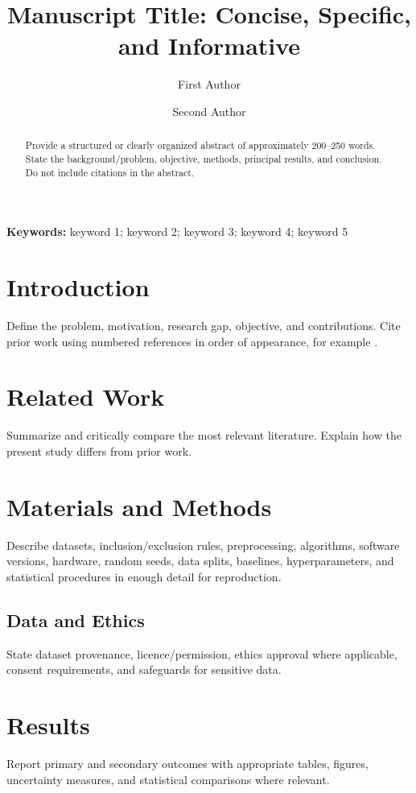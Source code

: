 \documentclass[11pt,a4paper]{article}
\title{Manuscript Title: Concise, Specific, and Informative}
\author[1]{First Author}
\author[2]{Second Author}
\affil[1]{Department, Faculty, University, City, Country}
\affil[2]{Department, Faculty, University, City, Country}
\date{}
\begin{document}
\maketitle

\begin{abstract}
Provide a structured or clearly organized abstract of approximately 200--250 words. State the background/problem, objective, methods, principal results, and conclusion. Do not include citations in the abstract.
\end{abstract}

\noindent\textbf{Keywords:} keyword 1; keyword 2; keyword 3; keyword 4; keyword 5

\section{Introduction}
Define the problem, motivation, research gap, objective, and contributions. Cite prior work using numbered references in order of appearance, for example \cite{sample2026}.

\section{Related Work}
Summarize and critically compare the most relevant literature. Explain how the present study differs from prior work.

\section{Materials and Methods}
Describe datasets, inclusion/exclusion rules, preprocessing, algorithms, software versions, hardware, random seeds, data splits, baselines, hyperparameters, and statistical procedures in enough detail for reproduction.

\subsection{Data and Ethics}
State dataset provenance, licence/permission, ethics approval where applicable, consent requirements, and safeguards for sensitive data.

\section{Results}
Report primary and secondary outcomes with appropriate tables, figures, uncertainty measures, and statistical comparisons where relevant.
\end{document}
